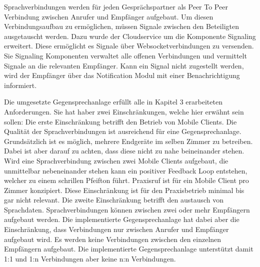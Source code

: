 Sprachverbindungen werden für jeden Gesprächspartner als Peer To Peer Verbindung zwischen Anrufer und Empfänger aufgebaut.
Um diesen Verbindungsaufbau zu ermöglichen, müssen Signale zwischen den Beteiligten ausgetauscht werden.
Dazu wurde der Cloudservice um die Komponente Signaling erweitert.
Diese ermöglicht es Signale über Websocketverbindungen zu versenden.
Sie Signaling Komponenten verwaltet alle offenen Verbindungen und vermittelt Signale an die relevanten Empfänger.
Kann ein Signal nicht zugestellt werden, wird der Empfänger über das Notification Modul mit einer Benachrichtigung informiert.

Die umgesetzte Gegensprechanlage erfüllt alle in Kapitel 3 erarbeiteten Anforderungen.
Sie hat haber zwei Einschränkungen, welche hier erwähnt sein sollen:
Die erste Einschränkung betrifft den Betrieb von Mobile Clients.
Die Qualität der Sprachverbindungen ist ausreichend für eine Gegensprechanlage.
Grundsätzlich ist es möglich, mehrere Endgeräte im selben Zimmer zu betreiben.
Dabei ist aber darauf zu achten, dass diese nicht zu nahe beineinander stehen.
Wird eine Sprachverbindung zwischen zwei Mobile Clients aufgebaut, die unmittelbar nebeneinander stehen kann ein positiver Feedback Loop entstehen, welcher zu einem schrillen Pfeifton führt.
Praxisruf ist für ein Mobile Client pro Zimmer konzipiert.
Diese Einschränkung ist für den Praxisbetrieb minimal bis gar nicht relevant.
Die zweite Einschränkung betrifft den austausch von Sprachdaten. 
Sprachverbindungen können zwischen zwei oder mehr Empfängern aufgebaut werden.
Die implementierte Gegensprechanlage hat dabei aber die Einschränkung, dass Verbindungen nur zwischen Anrufer und Empfänger aufgebaut wird.
Es werden keine Verbindungen zwischen den einzelnen Empfängern aufgebaut.
Die implementierte Gegensprechanlage unterstützt damit 1:1 und 1:n Verbindungen aber keine n:n Verbindungen.
